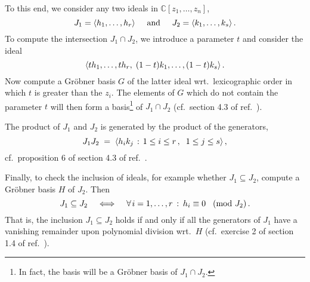\documentclass[dvipsnames,preprint,12pt,sort&compress]{elsarticle}
\begin{document}
To this end, we consider any two ideals in $\mathbb{C}[z_1, \ldots, z_n]$,
\begin{equation}
J_1 = \langle h_1, \ldots, h_r \rangle \hspace{5mm} \mathrm{and}
\hspace{5mm} J_2 = \langle k_1, \ldots, k_s \rangle \,.
\end{equation}
To compute the intersection $J_1 \cap J_2$, we introduce a parameter $t$
and consider the ideal
\begin{equation}
\langle t h_1, \ldots, t h_r, \hspace{1mm} (1-t) k_1, \ldots, (1-t) k_s \rangle \,.
\end{equation}
Now compute a Gr{\"o}bner basis $G$  of the latter ideal wrt.~lexicographic order
in which $t$ is greater than the $z_i$. The elements of $G$ which do not contain
the parameter $t$ will then form a basis\footnote{In fact, the basis will be
a Gr{\"o}bner basis of $J_1 \cap J_2$.}
of $J_1 \cap J_2$ (cf.~section 4.3 of ref.~\cite{IdealsVarietiesAlgorithms}).

The product of $J_1$ and $J_2$ is generated by the product of the generators,
\begin{equation}
J_1 J_2 \hspace{1mm}=\hspace{1mm} \langle h_i k_j \hspace{0.5mm} : \hspace{0.5mm} 1 \leq i \leq r \,, \hspace{2mm} 1 \leq j \leq s \rangle \,,
\end{equation}
cf.~proposition 6 of section 4.3 of ref.~\cite{IdealsVarietiesAlgorithms}.

Finally, to check the inclusion of ideals, for example whether $J_1 \subseteq J_2$,
compute a Gr{\"o}bner basis $H$ of $J_2$. Then
\begin{equation}
J_1 \subseteq J_2 \hspace{4mm} \Longleftrightarrow \hspace{4mm}
\forall \hspace{0.4mm} i = 1,\ldots, r \hspace{0.7mm} : \hspace{0.7mm} h_i \equiv 0 \hspace{3mm} \mbox{(mod $J_2$)} \,.
\end{equation}
That is, the inclusion $J_1 \subseteq J_2$ holds if and only if
all the generators of $J_1$ have a vanishing remainder upon polynomial division wrt.~$H$
(cf.~exercise 2 of section 1.4 of ref.~\cite{IdealsVarietiesAlgorithms}).
\end{document}
